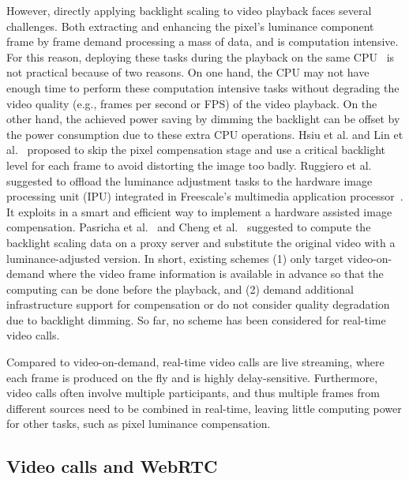 However, directly applying backlight scaling to video playback faces
several challenges. Both extracting and enhancing the pixel's luminance
component frame by frame demand processing a mass of data, and is
computation intensive.  For this reason, deploying these tasks during
the playback on the same CPU~\cite{CHP07, CSC02} is not practical
because of two reasons.  On one hand, the CPU may not have enough
time to perform these computation intensive tasks without degrading
the video quality (e.g., frames per second or FPS) of the video
playback. On the other hand, the achieved power saving by dimming the
backlight can be offset by the power consumption due to these extra
CPU operations. Hsiu et al. and Lin et al.~\cite{LHH14, HLH11}
proposed to skip the pixel compensation stage and use a critical
backlight level for each frame to avoid distorting the image too
badly. Ruggiero et al. suggested to offload the luminance adjustment
tasks to the hardware image processing unit (IPU) integrated in
Freescale's multimedia application processor~\cite{RBB08}. It exploits
in a smart and efficient way to implement a hardware assisted image
compensation. Pasricha et al.~\cite{PMLDV03} and Cheng et
al.~\cite{CMEDV07} suggested to compute the backlight scaling data on
a proxy server and substitute the original video with a
luminance-adjusted version. 
 In short, existing schemes (1) only target
video-on-demand where the video frame information is available in
advance so that the computing can be done before the playback, and (2)
demand additional infrastructure support for compensation or do not
consider quality degradation due to backlight dimming. So far, no
scheme has been considered for real-time video calls.

Compared to video-on-demand, real-time video calls are live streaming,
where each frame is produced on the fly and is highly
delay-sensitive. Furthermore, video calls often involve multiple
participants, and thus multiple frames from different sources need
to be combined in real-time, leaving little computing power for other
tasks, such as pixel luminance compensation.

\subsection{Video calls and WebRTC}

